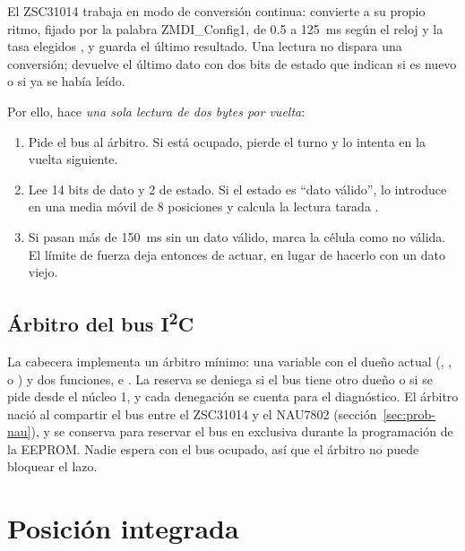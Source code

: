 El ZSC31014 trabaja en modo de conversión continua: convierte a su propio ritmo, fijado por la
palabra ZMDI\_Config1, de \num{0.5} a \SI{125}{\milli\second} según el reloj y la tasa elegidos
\cite{zsc31014}, y guarda el último resultado. Una lectura no dispara una conversión; devuelve el
último dato con dos bits de estado que indican si es nuevo o si ya se había leído.

Por ello,  hace \emph{una sola lectura de dos bytes por vuelta}:
\begin{enumerate}
  \item Pide el bus al árbitro. Si está ocupado, pierde el turno y lo intenta en la vuelta siguiente.
  \item Lee 14 bits de dato y 2 de estado. Si el estado es ``dato válido'', lo introduce en una media
        móvil de 8 posiciones y calcula la lectura tarada .
  \item Si pasan más de \SI{150}{\milli\second} sin un dato válido, marca la célula como no válida. El
        límite de fuerza deja entonces de actuar, en lugar de hacerlo con un dato viejo.
\end{enumerate}

\subsection{Árbitro del bus I\textsuperscript{2}C}

La cabecera  implementa un árbitro mínimo: una variable con el dueño actual
(, ,  o ) y dos funciones,
 e . La reserva se deniega si el bus tiene otro dueño o si se
pide desde el núcleo 1, y cada denegación se cuenta para el diagnóstico. El árbitro nació al
compartir el bus entre el ZSC31014 y el NAU7802 (sección~\ref{sec:prob-nau}), y se conserva para
reservar el bus en exclusiva durante la programación de la EEPROM. Nadie espera con el bus ocupado,
así que el árbitro no puede bloquear el lazo.

\section{Posición integrada}
\label{sec:fw-posicion}

